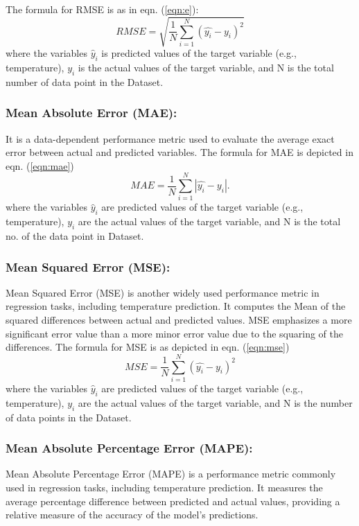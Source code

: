 \documentclass[sn-mathphys,Numbered]{sn-jnl}
\theoremstyle{thmstyleone}
\theoremstyle{thmstyletwo}
\theoremstyle{thmstylethree}
\begin{document}
The formula for RMSE is as in eqn. (\ref{eqn:e}):
\begin{equation}
\label{eqn:e}
RMSE = \sqrt {\frac{1}{N} \sum_{i=1}^{N} (\hat{y_{i}} - y_{i})^2}
\end{equation}
where the variables $\hat{y}_i$ is predicted values of the target variable (e.g., temperature), $y_i$ is the actual values of the target variable, and N is the total number of data point in the Dataset.
\subsubsection{Mean Absolute Error (MAE):} It is a data-dependent performance metric used to evaluate the average exact error between actual and predicted variables. The formula for MAE is depicted in eqn. (\ref{eqn:mae})
\begin{equation}
\label{eqn:mae}
MAE = \frac{1}{N} \sum_{i=1}^{N} \left|\hat{y_{i}} - y_{i}\right| .
\end{equation}
where the variables $\hat{y}_i$ are predicted values of the target variable (e.g., temperature), $y_i$ are the actual values of the target variable, and N is the total no. of the data point in Dataset.

\subsubsection{Mean Squared Error (MSE):}
Mean Squared Error (MSE) is another widely used performance metric in regression tasks, including temperature prediction. It computes the Mean of the squared differences between actual and predicted values. MSE emphasizes a more significant error value than a more minor error value due to the squaring of the differences.
The formula for MSE is as depicted in eqn. (\ref{eqn:mse})
\begin{equation}
\label{eqn:mse}
MSE = \frac{1}{N} \sum_{i=1}^{N} (\hat{y_{i}} - y_{i})^2
\end{equation}
where the variables $\hat{y}_i$ are predicted values of the target variable (e.g., temperature), $y_i$ are the actual values of the target variable, and N is the number of data points in the Dataset.


\subsubsection{Mean Absolute Percentage Error (MAPE):}
Mean Absolute Percentage Error (MAPE) is a performance metric commonly used in regression tasks, including temperature prediction. It measures the average percentage difference between predicted and actual values, providing a relative measure of the accuracy of the model's predictions.
\end{document}
